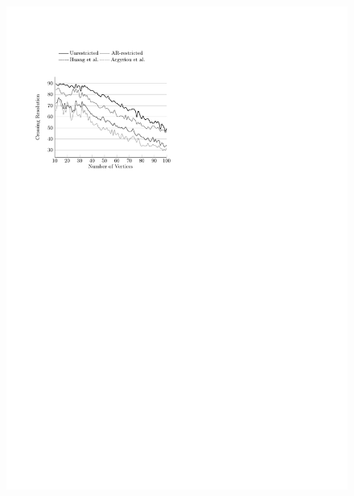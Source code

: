 \documentclass{comjnl}
\begin{document}
\begin{figure}[t]
{	\includegraphics[scale=0.99,page=2]{figures/rome}}
	

\end{figure}
\end{document}
